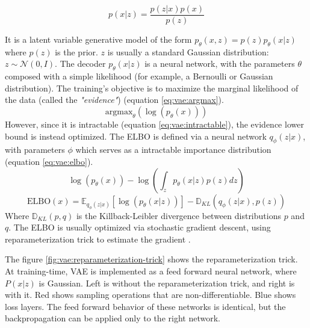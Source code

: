 \documentclass[12pt]{report}
\begin{document}
\begin{equation}
    p(x|z) = \frac{p(z|x) p(x)}{p(z)}
    \label{eq:bayesian-theorem}
\end{equation}

It is a latent variable generative model of the form $p_{\theta}(x, z) = p(z)p_{\theta}(x|z)$ where $p(z)$ is the prior.
$z$ is usually a standard Gaussian distribution: $z \sim \mathcal{N} (0, I)$.
The decoder $p_{\theta}(x|z)$ is a neural network, with the parameters $\theta$ composed with a simple likelihood (for example, a Bernoulli or Gaussian distribution).
The training's objective is to maximize the marginal likelihood of the data (called the \textit{"evidence"}) (equation \ref{eq:vae:argmax}).
\begin{equation}
    \text{argmax}_{\theta} (\log(p_{\theta} (x)))
    \label{eq:vae:argmax}
\end{equation}
However, since it is intractable (equation \ref{eq:vae:intractable}), the evidence lower bound is instead optimized. The ELBO is defined via a neural network $q_{\phi}(z|x)$, with parameters $\phi$ which serves as a intractable importance distribution (equation \ref{eq:vae:elbo}).
\begin{equation}
    \log (p_{\theta} (x)) - \log \left( \int_{z} p_{\theta} (x|z) p(z) dz\right)
    \label{eq:vae:intractable}
\end{equation}
\begin{equation}
    \text{ELBO}(x) = \mathbb{E}_{q_{\phi}(z|x)} \left[ \log (p_{\theta}(x|z)) \right] - \mathbb{D}_{KL} \left( q_{\phi}(z|x), p(z) \right)
    \label{eq:vae:elbo}
\end{equation}
Where $\mathbb{D}_{KL}(p, q)$ is the Killback-Leibler divergence between distributions $p$ and $q$.
The ELBO is usually optimized via stochastic gradient descent, using reparameterization trick to estimate the gradient \cite{kingma_auto-encoding_2014}.

The figure \ref{fig:vae:reparameterization-trick} shows the reparameterization trick.
At training-time, VAE is implemented as a feed forward neural network, where $P(x|z)$ is Gaussian.
Left is without the reparameterization trick, and right is with it.
Red shows sampling operations that are non-differentiable.
Blue shows loss layers.
The feed forward behavior of these networks is identical, but the backpropagation can be applied only to the right network.
\end{document}
